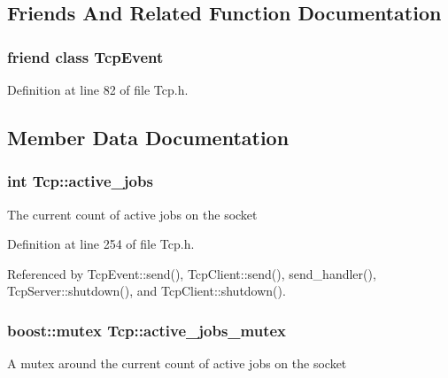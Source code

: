 \subsection{Friends And Related Function Documentation}
\hypertarget{classTcp_ac01935b5a2bc7cc5ef28348f3d64ffa2}{
\subsubsection[{TcpEvent}]{\setlength{\rightskip}{0pt plus 5cm}friend class {\bf TcpEvent}}}
\label{classTcp_ac01935b5a2bc7cc5ef28348f3d64ffa2}


Definition at line 82 of file Tcp.h.



\subsection{Member Data Documentation}
\hypertarget{classTcp_a4811b96fe77f74f10b14aac532036708}{
\subsubsection[{active\_\-jobs}]{\setlength{\rightskip}{0pt plus 5cm}int {\bf Tcp::active\_\-jobs}}}
\label{classTcp_a4811b96fe77f74f10b14aac532036708}
The current count of active jobs on the socket 

Definition at line 254 of file Tcp.h.



Referenced by TcpEvent::send(), TcpClient::send(), send\_\-handler(), TcpServer::shutdown(), and TcpClient::shutdown().

\hypertarget{classTcp_adcd27ee2753e2c0c43f58efa882a3ab5}{
\subsubsection[{active\_\-jobs\_\-mutex}]{\setlength{\rightskip}{0pt plus 5cm}boost::mutex {\bf Tcp::active\_\-jobs\_\-mutex}}}
\label{classTcp_adcd27ee2753e2c0c43f58efa882a3ab5}
A mutex around the current count of active jobs on the socket 

